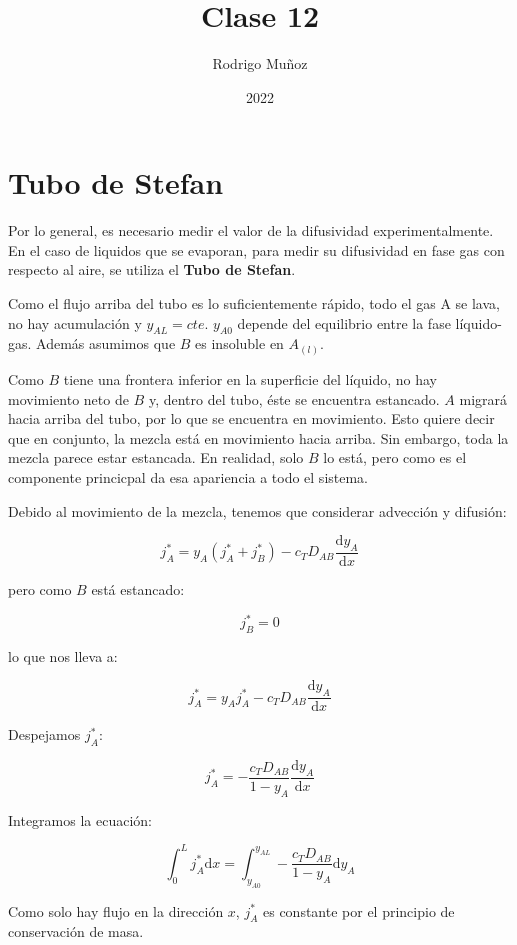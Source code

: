 \documentclass[11pt]{article}
\title{Clase 12}
\author{Rodrigo Muñoz}
\date{2022}
\begin{document}
\maketitle

\section{Tubo de Stefan}

Por lo general, es necesario medir el valor de la difusividad experimentalmente. En el caso de liquidos que se evaporan, para medir su difusividad en fase gas con respecto al aire, se utiliza el \textbf{Tubo de Stefan}.

Como el flujo arriba del tubo es lo suficientemente rápido, todo el gas A se lava, no hay acumulación y \( y_{AL} = cte \). \( y_{A0} \) depende del equilibrio entre la fase líquido-gas. Además asumimos que \( B \) es insoluble en \( A_{ \left( l \right) } \).

Como \( B \) tiene una frontera inferior en la superficie del líquido, no hay movimiento neto de \( B \) y, dentro del tubo, éste se encuentra estancado. \( A \) migrará hacia arriba del tubo, por lo que se encuentra en movimiento. Esto quiere decir que en conjunto, la mezcla está en movimiento hacia arriba. Sin embargo, toda la mezcla parece estar estancada. En realidad, solo \( B \) lo está, pero como es el componente princicpal da esa apariencia a todo el sistema.

Debido al movimiento de la mezcla, tenemos que considerar advección y difusión:

\[ j_A^* = y_A \left( j_A^* + j_B^* \right) - c_T D_{AB} \frac{ \mathrm d y_A }{ \mathrm d x } \]

pero como \( B \) está estancado:

\[ j_B^* = 0 \]

lo que nos lleva a:

\[ j_A^* = y_A j_A^* - c_T D_{AB} \frac{ \mathrm d y_A }{ \mathrm d x } \]

Despejamos \( j_A^* \):

\[ j_A^* = - \frac{ c_T D_{AB} }{ 1 - y_A } \frac{ \mathrm d y_A }{ \mathrm d x } \]

Integramos la ecuación:

\[ \int_0^L j_A^* \mathrm dx = \int_{y_{A0}}^{y_{AL}} - \frac{ c_T D_{AB} }{ 1 - y_A } \mathrm d y_A \]

Como solo hay flujo en la dirección \( x \), \( j_A^* \) es constante por el principio de conservación de masa.
\end{document}
